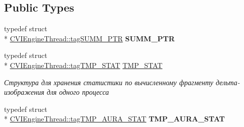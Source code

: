 \subsection*{Public Types}
\begin{DoxyCompactItemize}
\item 
\hypertarget{class_c_v_i_engine_thread_adaf393bce3e0f8abe027cbfae7acfffb}{typedef struct \\*
\hyperlink{struct_c_v_i_engine_thread_1_1tag_s_u_m_m___p_t_r}{C\+V\+I\+Engine\+Thread\+::tag\+S\+U\+M\+M\+\_\+\+P\+T\+R} {\bfseries S\+U\+M\+M\+\_\+\+P\+T\+R}}\label{class_c_v_i_engine_thread_adaf393bce3e0f8abe027cbfae7acfffb}

\item 
typedef struct \\*
\hyperlink{struct_c_v_i_engine_thread_1_1tag_t_m_p___s_t_a_t}{C\+V\+I\+Engine\+Thread\+::tag\+T\+M\+P\+\_\+\+S\+T\+A\+T} \hyperlink{class_c_v_i_engine_thread_a963dcd94cfc9dd191a6c4dc50458797f}{T\+M\+P\+\_\+\+S\+T\+A\+T}
\begin{DoxyCompactList}\small\item\em Структура для хранения статистики по вычисленному фрагменту дельта-\/изображения для одного процесса \end{DoxyCompactList}\item 
\hypertarget{class_c_v_i_engine_thread_a07cb3ebb98282ee62c81cf9b257e335c}{typedef struct \\*
\hyperlink{struct_c_v_i_engine_thread_1_1tag_t_m_p___a_u_r_a___s_t_a_t}{C\+V\+I\+Engine\+Thread\+::tag\+T\+M\+P\+\_\+\+A\+U\+R\+A\+\_\+\+S\+T\+A\+T} {\bfseries T\+M\+P\+\_\+\+A\+U\+R\+A\+\_\+\+S\+T\+A\+T}}\label{class_c_v_i_engine_thread_a07cb3ebb98282ee62c81cf9b257e335c}

\end{DoxyCompactItemize}
